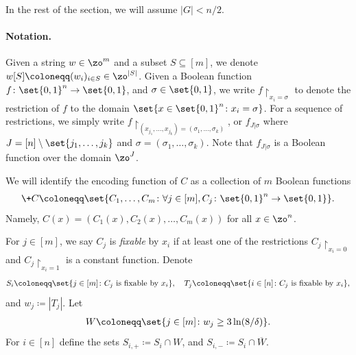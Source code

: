 In the rest of the section, we will assume $|G| < n/2$. 
\fi

\paragraph{Notation.} Given a string $w \in \zo^m$ and a subset $S\subseteq [m]$, we denote $w[S]\coloneqq (w_i)_{i\in S} \in \zo^{|S|}$. Given a Boolean function $f \colon \set{0,1}^{n} \rightarrow \set{0,1}$, and $\sigma \in \set{0,1}$, we write $f\restriction_{x_i = \sigma}$ to denote the restriction of $f$ to the domain $\set{\*x \in \set{0,1}^n \colon x_i = \sigma}$. For a sequence of restrictions, we simply write $f\restriction_{(x_{j_1}, \dots, x_{j_k})=(\sigma_1,\dots,\sigma_k)}$, or $f_{J|\sigma}$ where $J=[n]\setminus\set{j_1,\dots,j_k}$ and $\sigma=(\sigma_1,\dots,\sigma_k)$. Note that $f_{J|\sigma}$ is a Boolean function over the domain $\zo^{J}$. 

We will identify the encoding function of $C$ as a collection of $m$ Boolean functions
\begin{align*} 
\+C \coloneqq \set{C_1, \dots, C_m \colon \forall j \in [m], C_j \colon \set{0,1}^n \rightarrow \set{0,1}}.
\end{align*}
Namely, $C(x)=(C_1(x), C_2(x), \dots, C_m(x))$ for all $x \in \zo^n$.

For $j \in [m]$, we say $C_j$ is \emph{fixable} by $x_i$ if at least one of the restrictions $C_j\restriction_{x_i=0}$ and $C_j\restriction_{x_i=1}$ is a constant function. Denote
\begin{align*}
S_i \coloneqq \set{j \in [m] \colon C_j\textup{ is fixable by }x_i}, \quad T_j \coloneqq \set{i \in [n] \colon C_j\textup{ is fixable by }x_i},
\end{align*}
and $w_{j} \coloneqq |T_j|$. Let 
\begin{align*}
W \coloneqq \set{j \in [m] \colon w_{j} \ge 3\ln(8/\delta) }.
\end{align*}
For $i \in [n]$ define the sets $S_{i,+} \coloneqq S_{i} \cap W$, and $S_{i,-} \coloneqq S_i \cap \overline{W}$.

